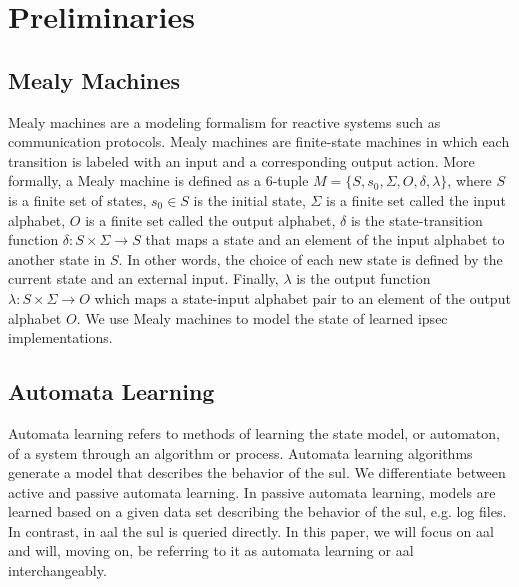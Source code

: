 %
%
% 
% 
% 

\chapter{Preliminaries}

\label{chap:Preliminaries}

\section{Mealy Machines}
Mealy machines are a modeling formalism for reactive systems such as communication protocols. Mealy machines are finite-state machines in which each transition is labeled with an input and a corresponding output action. More formally, a Mealy machine is defined as a 6-tuple $M = \{S, s_0, \Sigma, O, \delta, \lambda\}$, where $S$ is a finite set of states, $s_0 \in S$ is the initial state, $\Sigma$ is a finite set called the input alphabet, $O$ is a finite set called the output alphabet, $\delta$ is the state-transition function $\delta \colon S \times \Sigma \rightarrow S$ that maps a state and an element of the input alphabet to another state in $S$. In other words, the choice of each new state is defined by the current state and an external input. Finally, $\lambda$ is the output function $\lambda \colon S \times \Sigma \rightarrow O$ which maps a state-input alphabet pair to an element of the output alphabet $O$. We use Mealy machines to model the state of learned \ac{ipsec} implementations.

\section{Automata Learning}
Automata learning refers to methods of learning the state model, or automaton, of a system through an algorithm or process. Automata learning algorithms generate a model that describes the behavior of the \ac{sul}. We differentiate between active and passive automata learning. In passive automata learning, models are learned based on a given data set describing the behavior of the \ac{sul}, e.g. log files. In contrast, in \ac{aal} the \ac{sul} is queried directly. In this paper, we will focus on \ac{aal} and will, moving on, be referring to it as automata learning or \ac{aal} interchangeably. 

